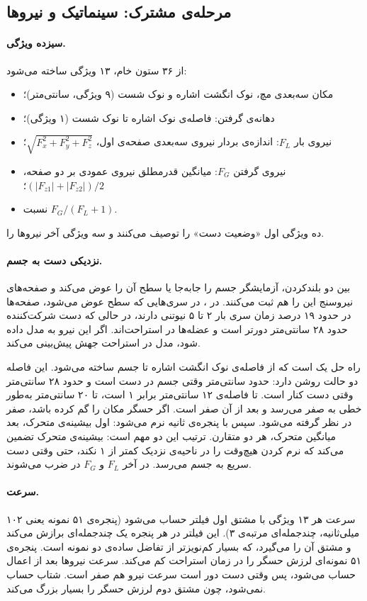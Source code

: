 \subsection{مرحله‌ی مشترک: سینماتیک و نیروها}

\paragraph{سیزده ویژگی.} از ۳۶ ستون خام، ۱۳ ویژگی ساخته می‌شود:
\begin{itemize}
\item مکان سه‌بعدی مچ، نوک انگشت اشاره و نوک شست (۹ ویژگی، سانتی‌متر)؛
\item دهانه‌ی گرفتن: فاصله‌ی نوک اشاره تا نوک شست (۱ ویژگی)؛
\item نیروی بار $F_L$: اندازه‌ی بردار نیروی سه‌بعدی صفحه‌ی اول، $\sqrt{F_x^2+F_y^2+F_z^2}$؛
\item نیروی گرفتن $F_G$: میانگین قدرمطلق نیروی عمودی بر دو صفحه، $(|F_{z1}|+|F_{z2}|)/2$؛
\item نسبت $F_G/(F_L+1)$.
\end{itemize}
ده ویژگی اول «وضعیت دست» را توصیف می‌کنند و سه ویژگی آخر نیروها را.

\paragraph{ نزدیکی دست به جسم.} بین دو بلندکردن، آزمایشگر جسم را جابه‌جا یا سطح آن را عوض می‌کند و صفحه‌های نیروسنج این را هم ثبت می‌کنند. در ، در سری‌هایی که سطح عوض می‌شود، صفحه‌ها در حدود ۱۹ درصد زمان سری بار ۲ تا ۵ نیوتنی دارند، در حالی که دست شرکت‌کننده حدود ۲۸ سانتی‌متر دورتر است و عضله‌ها در استراحت‌اند. اگر این نیرو به مدل داده شود، مدل در استراحت جهش  پیش‌بینی می‌کند.

راه حل یک  است که از فاصله‌ی نوک انگشت اشاره تا جسم ساخته می‌شود. این فاصله دو حالت روشن دارد: حدود  سانتی‌متر وقتی جسم در دست است و حدود ۲۸ سانتی‌متر وقتی دست کنار است.  تا فاصله‌ی ۱۲ سانتی‌متر برابر ۱ است، تا ۲۰ سانتی‌متر به‌طور خطی به صفر می‌رسد و بعد از آن صفر است. اگر حسگر مکان را گم کرده باشد،  صفر در نظر گرفته می‌شود. سپس  با پنجره‌ی  ثانیه نرم می‌شود: اول بیشینه‌ی متحرک، بعد میانگین متحرک، هر دو متقارن. ترتیب این دو مهم است: بیشینه‌ی متحرک تضمین می‌کند که نرم کردن هیچ‌وقت  را در ناحیه‌ی نزدیک کمتر از ۱ نکند، حتی وقتی دست سریع به جسم می‌رسد. در آخر $F_L$ و $F_G$ در  ضرب می‌شوند.

\paragraph{سرعت.} سرعت هر ۱۳ ویژگی با مشتق اول فیلتر  حساب می‌شود (پنجره‌ی ۵۱ نمونه یعنی ۱۰۲ میلی‌ثانیه، چندجمله‌ای مرتبه‌ی ۳). این فیلتر در هر پنجره یک چندجمله‌ای برازش می‌کند و مشتق آن را می‌گیرد، که بسیار کم‌نویزتر از تفاضل ساده‌ی دو نمونه است. پنجره‌ی ۵۱ نمونه‌ای لرزش حسگر را در زمان استراحت کم می‌کند. سرعت نیروها بعد از اعمال  حساب می‌شود، پس وقتی دست دور است سرعت نیرو هم صفر است. شتاب حساب نمی‌شود، چون مشتق دوم لرزش حسگر را بسیار بزرگ می‌کند.

